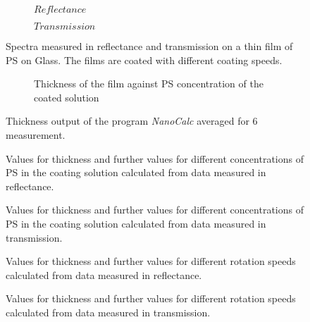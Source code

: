 \begin{figure}[h]
    \centering
    \begin{subfigure}[b]{0.70\textwidth}
        \centering
        
        \caption{$Reflectance$}
        \label{fig:y equals x}
    \end{subfigure}  
    

    \begin{subfigure}[b]{0.70\textwidth}
        \centering
           
        \caption{$Transmission$} 
        \label{fig:three sin x}
    \end{subfigure}

    \caption{Spectra measured in reflectance and transmission on a thin film of PS on Glass. The films are coated with different coating speeds.}
    \label{fig:SpecRefTrans}
\end{figure}


\begin{figure}[h]
    \centering


    \vspace{1cm}
    \begin{subfigure}[b]{\textwidth}
        \centering
           
        \caption{Thickness of the film against PS concentration of the coated solution} 
        \label{fig:VglMethRotThick}
    \end{subfigure}

    \caption{Thickness output of the program \textit{NanoCalc} averaged for 6 measurement.}
    \label{fig:thickconcrpm}
\end{figure}

\begin{figure}[h]
    
    \caption{Values for thickness and further values for different concentrations of PS in the coating solution calculated from data measured in reflectance.}
    \label{tab:ConcThickRef}
\end{figure}

\begin{figure}[h]
    
    \caption{Values for thickness and further values for different concentrations of PS in the coating solution calculated from data measured in transmission.}
    \label{tab:ConcThickTrans}
\end{figure}

\begin{figure}[h]
    
    \caption{Values for thickness and further values for different rotation speeds calculated from data measured in reflectance.}
    \label{tab:RotThickRef}
\end{figure}

\begin{figure}[h]
    
    \caption{Values for thickness and further values for different rotation speeds calculated from data measured in transmission.}
    \label{tab:RotThickTrans}
\end{figure}